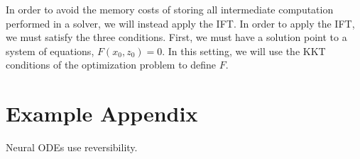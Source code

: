 \documentclass[11pt]{article}
\begin{document}
In order to avoid the memory costs of storing all intermediate computation performed
in a solver, we will instead apply the IFT.
In order to apply the IFT, we must satisfy the three conditions.
First, we must have a solution point to a system of equations, $F(x_0, z_0) = 0$.
In this setting, we will use the KKT conditions of the optimization problem to define $F$.




\appendix

\section{Example Appendix}
\label{sec:appendix}

Neural ODEs use reversibility.
\end{document}
